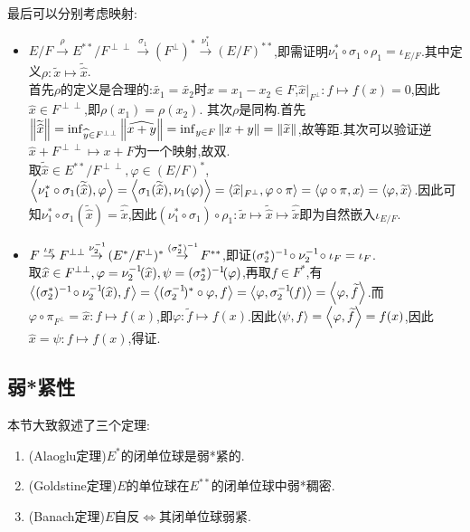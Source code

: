\documentclass{article}
\begin{document}
最后可以分别考虑映射:
\begin{itemize}
    \item $E/F\stackrel{\rho}{\to}E^{**}/F^{\perp\perp}\stackrel{\sigma_1}{\to}(F^\perp)^*\stackrel{\nu_1^*}{\to}(E/F)^{**}$,即需证明$\nu_1^*\circ\sigma_1\circ\rho_1=\iota_{E/F}$.其中定义$\rho:\widetilde{x}\mapsto\widetilde{\widehat{x}}$.\\
    首先$\rho$的定义是合理的:$\widetilde{x_1}=\widetilde{x_2}$时$x=x_1-x_2\in F$,$\widehat{x}|_{F^\perp}:f\mapsto f(x)=0$,因此$\widehat{x}\in F^{\perp\perp}$,即$\rho(x_1)=\rho(x_2)$.
    其次$\rho$是同构.首先$\left\|\widetilde{\widehat{x}}\right\|=\inf_{\widehat{y}\in F^{\perp\perp}}\left\|\widehat{x+y}\right\|=\inf_{y\in F}\left\|x+y\right\|=\left\|\widetilde{x}\right\|$,故等距.其次可以验证逆$\widehat{x}+F^{\perp\perp}\mapsto x+F$为一个映射,故双.\\
    取$\widetilde{\widehat{x}}\in E^{**}/F^{\perp\perp}, \varphi\in (E/F)^*$, $\left<\nu_1^*\circ\sigma_1(\widetilde{\widehat{x}}),\varphi\right>=\left<\sigma_1(\widetilde{\widehat{x}}),\nu_1(\varphi)\right>=\left<\widehat{x}|_{F^\perp},\varphi\circ\pi\right>=\left<\varphi\circ\pi,x\right>=\left<\varphi,\widetilde{x}\right>$.因此可知$\nu_1^*\circ\sigma_1(\widetilde{\widehat{x}})=\widehat{\widetilde{x}}$,因此$(\nu_1^*\circ\sigma_1)\circ\rho_1:\widetilde{x}\mapsto\widetilde{\widehat{x}}\mapsto\widehat{\widetilde{x}}$即为自然嵌入$\iota_{E/F}$.
    \item $F\stackrel{\iota_F}{\to}F^{\perp\perp}\stackrel{\nu_2^{-1}\!}{\to}(E^*/F^\perp)^*\stackrel{(\sigma^*_2)^{-1}\!}{\to}F^{**}$,即证$(\sigma_2^*)^{-1}\!\circ\nu_2^{-1}\!\circ\iota_F=\iota_F$.\\
    取$\widehat{x}\in F^{\perp\perp}, \varphi=\nu_2^{-1}\!(\widehat{x}), \psi=(\sigma_2^*)^{-1}\!(\varphi)$,再取$f\in F^*$,有$\left<(\sigma_2^*)^{-1}\!\circ\nu_2^{-1}\!(\widehat{x}),f\right>=\left<(\sigma_2^{-1}\!)^*\circ\varphi,f\right>=\left<\varphi,\sigma_2^{-1}\!(f)\right>=\left<\varphi,\widetilde{f}\right>$.而$\varphi\circ\pi_{F^\perp}=\widehat{x}:f\mapsto f(x)$,即$\varphi:\widetilde{f}\mapsto f(x)$.因此$\left<\psi,f\right>=\left<\varphi,\widetilde{f}\right>=f(x)$,因此$\widehat{x}=\psi:f\mapsto f(x)$,得证.
\end{itemize}

\subsection{弱*紧性}
本节大致叙述了三个定理:
\begin{enumerate}
    \item (Alaoglu定理)$E^*$的闭单位球是弱*紧的.
    \item (Goldstine定理)$E$的单位球在$E^{**}$的闭单位球中弱*稠密.
    \item (Banach定理)$E$自反$\iff$其闭单位球弱紧.
\end{enumerate}
\end{document}
